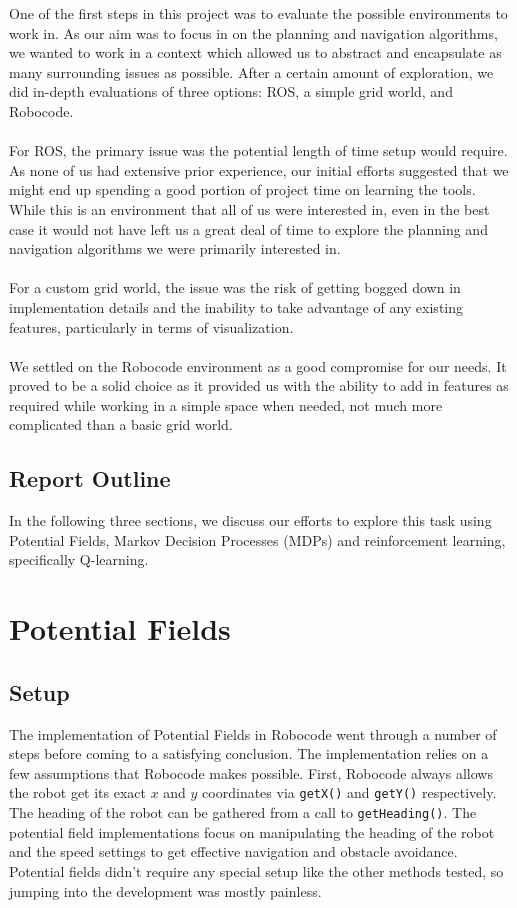 \documentclass{aiaa-tc}%
\begin{document}
One of the first steps in this project was to evaluate the possible
environments to work in. As our aim was to focus in on the planning and navigation algorithms,
we wanted to work in a context which allowed us to abstract and
encapsulate as many
surrounding issues as possible. After a certain amount of exploration, we did
in-depth evaluations of three options: ROS, a simple grid world, and
Robocode. \\ \\
For ROS, the primary issue was the potential length of time setup
would require. As none of us had extensive prior experience, our
initial efforts suggested that we might end up spending a good portion
of project time on learning the tools. While this is an environment that all
of us were interested in, even in the best case it would not have left
us a great deal of time to explore the planning and navigation
algorithms we were primarily interested in. \\ \\
For a custom grid world, the issue was the risk of getting bogged down
in implementation details and the inability to take advantage of any
existing features, particularly in terms of visualization. \\ \\
We settled on the Robocode environment as a good compromise for our
needs. It proved to be a solid choice as it provided us with the
ability to add in features as required while working in a simple
space when needed, not much more complicated than a basic grid world.


\subsection{Report Outline}
In the following three sections, we discuss our efforts to explore
this task using Potential Fields, Markov Decision Processes (MDPs) and
reinforcement learning, specifically Q-learning.

\section{Potential Fields}
\label{Potential Fields}

\subsection{Setup}
The implementation of Potential Fields in Robocode went through a number of steps before coming to a satisfying conclusion. The implementation relies on a few assumptions that Robocode makes possible. First, Robocode always allows the robot get its exact $x$ and $y$ coordinates via \verb|getX()| and \verb|getY()| respectively. The heading of the robot can be gathered from a call to \verb|getHeading()|. The potential field implementations focus on manipulating the heading of the robot and the speed settings to get effective navigation and obstacle avoidance. Potential fields didn't require any special setup like the other methods tested, so jumping into the development was mostly painless.
\end{document}

